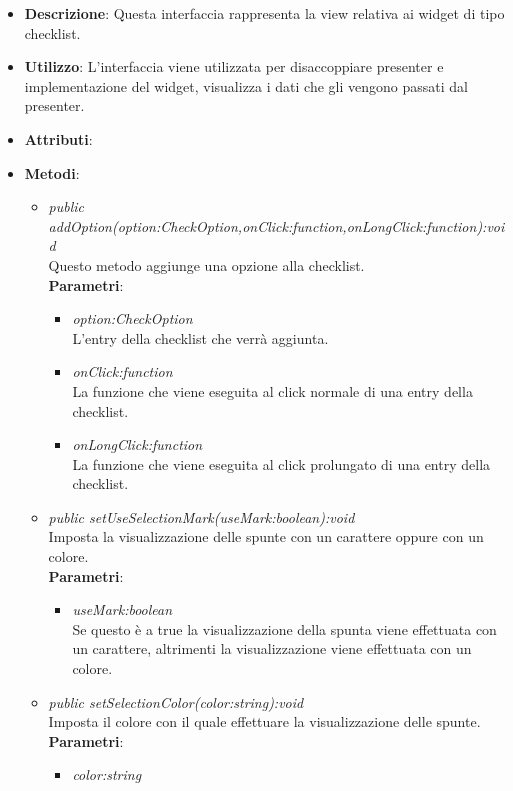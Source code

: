 \begin{itemize}
\item \textbf{Descrizione}: Questa interfaccia rappresenta la view relativa ai widget di tipo checklist.
\item \textbf{Utilizzo}: L'interfaccia viene utilizzata per disaccoppiare presenter e implementazione del widget, visualizza i dati che gli vengono passati dal presenter.
\item \textbf{Attributi}:
\item \textbf{Metodi}:
	\begin{itemize}
	\item \textit{public addOption(option:CheckOption,onClick:function,onLongClick:function):void}\\
	Questo metodo aggiunge una opzione alla checklist.
		\\ \textbf{Parametri}: \begin{itemize}
		\item \textit{option:CheckOption}\\
		L'entry della checklist che verrà aggiunta.
		\item \textit{onClick:function}\\
		La funzione che viene eseguita al click normale di una entry della checklist.
		\item \textit{onLongClick:function}\\
		La funzione che viene eseguita al click prolungato di una entry della checklist.
		\end{itemize} 
	\item \textit{public setUseSelectionMark(useMark:boolean):void}\\
	Imposta la visualizzazione delle spunte con un carattere oppure con un colore.
		\\ \textbf{Parametri}: \begin{itemize}
		\item \textit{useMark:boolean}\\
		Se questo è a true la visualizzazione della spunta viene effettuata con un carattere, altrimenti la visualizzazione viene effettuata con un colore.
		\end{itemize}  
	\item \textit{public setSelectionColor(color:string):void}\\
	Imposta il colore con il quale effettuare la visualizzazione delle spunte.
		\\ \textbf{Parametri}: \begin{itemize}
		\item \textit{color:string}\\

\end{itemize}
\end{itemize}
\end{itemize}
